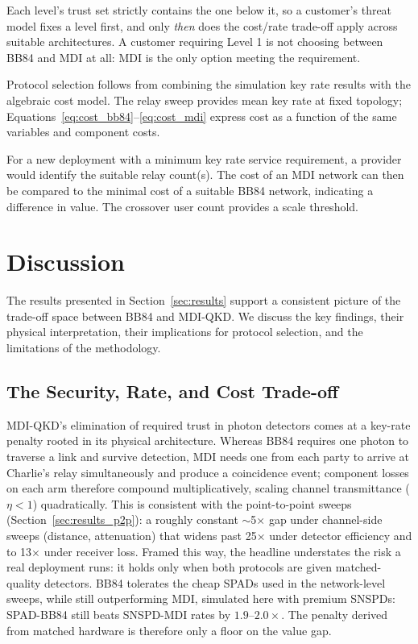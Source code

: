 \documentclass[12pt]{article}
\let\oldsection\section
\renewcommand{\section}{\clearpage\oldsection}
\begin{document}
Each level's trust set strictly contains the one below it, so a customer's threat model fixes a level first, and only \emph{then} does the cost/rate trade-off apply across suitable architectures. A customer requiring Level 1 is not choosing between BB84 and MDI at all: MDI is the only option meeting the requirement.

Protocol selection follows from combining the simulation key rate results with the algebraic cost model. The relay sweep provides mean key rate at fixed topology; Equations~\ref{eq:cost_bb84}--\ref{eq:cost_mdi} express cost as a function of the same variables and component costs.

For a new deployment with a minimum key rate service requirement, a provider would identify the suitable relay count(s). The cost of an MDI network can then be compared to the minimal cost of a suitable BB84 network, indicating a difference in value. The crossover user count provides a scale threshold.

\section{Discussion}
\label{sec:discussion}

The results presented in Section~\ref{sec:results} support a consistent picture of the trade-off space between BB84 and MDI-QKD. We discuss the key findings, their physical interpretation, their implications for protocol selection, and the limitations of the methodology.

\subsection{The Security, Rate, and Cost Trade-off}
\label{sec:security_rate}

MDI-QKD's elimination of required trust in photon detectors comes at a key-rate penalty rooted in its physical architecture. Whereas BB84 requires one photon to traverse a link and survive detection, MDI needs one from each party to arrive at Charlie's relay simultaneously and produce a coincidence event; component losses on each arm therefore compound multiplicatively, scaling channel transmittance ($\eta<1$) quadratically. This is consistent with the point-to-point sweeps (Section~\ref{sec:results_p2p}): a roughly constant $\sim$5$\times$ gap under channel-side sweeps (distance, attenuation) that widens past 25$\times$ under detector efficiency and to 13$\times$ under receiver loss. Framed this way, the headline understates the risk a real deployment runs: it holds only when both protocols are given matched-quality detectors. BB84 tolerates the cheap SPADs used in the network-level sweeps, while still outperforming MDI, simulated here with premium SNSPDs: SPAD-BB84 still beats SNSPD-MDI rates by $1.9$--$2.0\times$. The penalty derived from matched hardware is therefore only a floor on the value gap.
\end{document}
